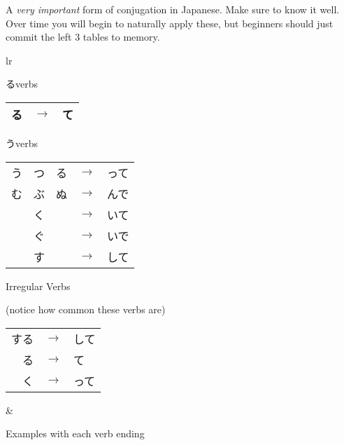     {
    A \textit{very important} form of conjugation in Japanese. Make sure to know it well. Over time you will begin to naturally apply these, but beginners should just commit the left 3 tables to memory.

   \begin{tabular}{lr}
        \begin{minipage}[b]{0.45\linewidth}
        るverbs

        \begin{tabular}{|ccc|}
            \hline
            る & $\rightarrow$ & て \\
            \hline
        \end{tabular}

        \vspace{1mm}
        うverbs

        \begin{tabular}{|ccc|}
            \hline
            う　つ　る & $\rightarrow$ & って \\
            む　ぶ　ぬ & $\rightarrow$ & んで \\ 
            く         & $\rightarrow$ & いて \\ 
            ぐ         & $\rightarrow$ & いで \\ 
            す         & $\rightarrow$ & して \\ 
            \hline
        \end{tabular}

        \vspace{1mm}
        Irregular Verbs

        (notice how common these verbs are)

        \begin{tabular}{|rcl|}
            \hline
            する & $\rightarrow$ & して \\
            \ruby{来}{く}る & $\rightarrow$ & \ruby{来}{き}て \\
            \ruby{行}{い}く & $\rightarrow$ & \ruby{行}{い}って \\
            \hline
        \end{tabular}
        \end{minipage}
    &
        \begin{minipage}[b]{0.45\linewidth}
        Examples with each verb ending


\end{minipage}
\end{tabular}}
